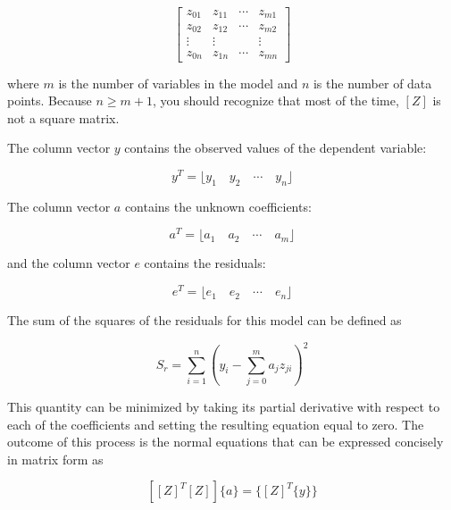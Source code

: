 \documentclass[../main.tex]{subfiles}
\begin{document}
\begin{equation}
	\begin{bmatrix}
		z_{01} & z_{11} & \cdots & z_{m1} \\ 
		z_{02} & z_{12} & \cdots & z_{m2} \\ 
		\vdots & \vdots &        & \vdots \\ 
		z_{0n} & z_{1n} & \cdots & z_{mn}
	\end{bmatrix}
\end{equation}

\noindent where $m$ is the number of variables in the model and $n$ is the number of data points. Because $n \geqslant  m + 1$, you should recognize that most of the time, $[Z]$ is not a square matrix.

The column vector ${y}$ contains the observed values of the dependent variable:

\begin{equation}
	{y}^T = \lfloor y_1 \quad  y_2 \quad \cdots \quad y_n \rfloor 
\end{equation}

\noindent The column vector ${a}$ contains the unknown coefficients:

\begin{equation}
	{a}^T = \lfloor a_1 \quad  a_2 \quad \cdots \quad a_m \rfloor 
\end{equation}

\noindent and the column vector ${e}$ contains the residuals:

\begin{equation}
	{e}^T = \lfloor e_1 \quad  e_2 \quad \cdots \quad e_n \rfloor 
\end{equation}

The sum of the squares of the residuals for this model can be defined as

\begin{equation}
	\tag{15.9}
	S_r = \sum^n_{i=1} {(y_i - \sum^m_{j=0} a_j z_{ji})}^2
\end{equation}

\noindent This quantity can be minimized by taking its partial derivative with respect to each of the
coefficients and setting the resulting equation equal to zero. The outcome of this process is
the normal equations that can be expressed concisely in matrix form as

\begin{equation}
	\tag{15.10}
	[{[Z]}^T [Z]] \{a\} = \{{[Z]}^T \{y\}\}
\end{equation}
\end{document}
